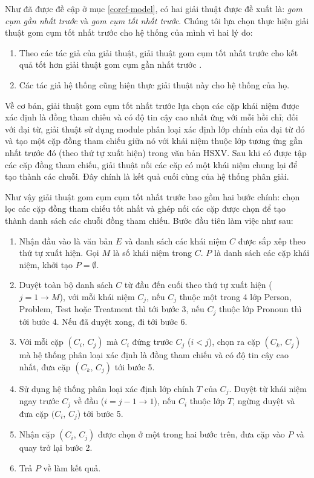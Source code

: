 Như đã được đề cập ở mục \ref{coref-model}, có hai giải thuật được đề xuất là: \emph{gom cụm gần nhất trước} và \emph{gom cụm tốt nhất trước}. Chúng tôi lựa chọn thực hiện giải thuật gom cụm tốt nhất trước cho hệ thống của mình vì hai lý do:
\begin{enumerate}
\item Theo các tác giả của giải thuật, giải thuật gom cụm tốt nhất trước cho kết quả tốt hơn giải thuật gom cụm gần nhất trước \cite{VincentNg2002a}.
\item Các tác giả hệ thống \cite{YanXu2012} cũng hiện thực giải thuật này cho hệ thống của họ.
\end{enumerate}

Về cơ bản, giải thuật gom cụm tốt nhất trước lựa chọn các cặp khái niệm được xác định là đồng tham chiếu và có độ tin cậy cao nhất ứng với mỗi hồi chỉ; đối với đại từ, giải thuật sử dụng module phân loại xác định lớp chính của đại từ đó và tạo một cặp đồng tham chiếu giữa nó với khái niệm thuộc lớp tương ứng gần nhất trước đó (theo thứ tự xuất hiện) trong văn bản HSXV. Sau khi có được tập các cặp đồng tham chiếu, giải thuật nối các cặp có một khái niệm chung lại để tạo thành các chuỗi. Đây chính là kết quả cuối cùng của hệ thống phân giải.

Như vậy giải thuật gom cụm cụm tốt nhất trước bao gồm hai bước chính: chọn lọc các cặp đồng tham chiếu tốt nhất và ghép nối các cặp được chọn để tạo thành danh sách các chuỗi đồng tham chiếu. Bước đầu tiên làm việc như sau:
\begin{enumerate}
\item Nhận đầu vào là văn bản $E$ và danh sách các khái niệm $C$ được sắp xếp theo thứ tự xuất hiện. Gọi $M$ là số khái niệm trong $C$. $P$ là danh sách các cặp khái niệm, khởi tạo $P=\emptyset$.
\item Duyệt toàn bộ danh sách $C$ từ đầu đến cuối theo thứ tự xuất hiện ($j=1\rightarrow M$), với mỗi khái niệm $C_j$, nếu $C_j$ thuộc một trong 4 lớp Person, Problem, Test hoặc Treatment thì tới bước 3, nếu $C_j$ thuộc lớp Pronoun thì tới bước 4. Nếu đã duyệt xong, đi tới bước 6.
\item Với mỗi cặp $(C_i,\,C_j)$ mà $C_i$ đứng trước $C_j$ ($i<j$), chọn ra cặp $(C_k,\,C_j)$ mà hệ thống phân loại xác định là đồng tham chiếu và có độ tin cậy cao nhất, đưa cặp $(C_k,\,C_j)$ tới bước 5.
\item Sử dụng hệ thống phân loại xác định lớp chính $T$ của $C_j$. Duyệt từ khái niệm ngay trước $C_j$ về đầu ($i=j-1\rightarrow 1$), nếu $C_i$ thuộc lớp $T$, ngừng duyệt và đưa cặp $(C_i,\,C_j$) tới bước 5.
\item Nhận cặp $(C_i,\,C_j)$ được chọn ở một trong hai bước trên, đưa cặp vào $P$ và quay trở lại bước 2.
\item Trả $P$ về làm kết quả.
\end{enumerate} 

